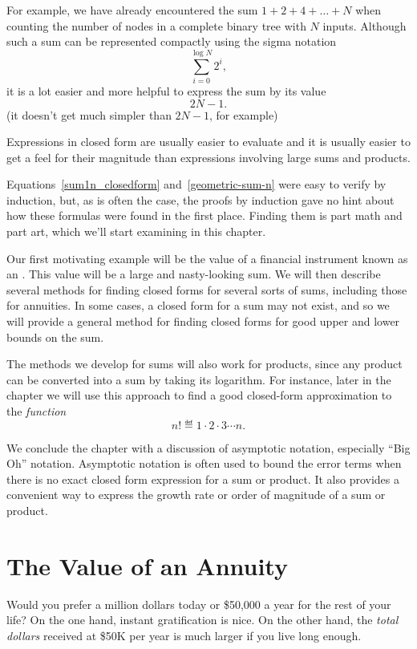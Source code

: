 For example, we have already encountered the sum $1 + 2 + 4 + \dots +
N$ when counting the number of nodes in a complete binary tree with
$N$ inputs.  Although such a sum can be represented compactly using
the sigma notation
\begin{equation}
    \sum_{i = 0}^{\log N} 2^i,
\end{equation}
it is a lot easier and more helpful to express the sum by
its  value
\[
    2 N - 1.
\]
(it doesn't get much simpler than $2 N - 1$, for example) 

Expressions in closed form are usually easier to evaluate and it is
usually easier to get a feel for their magnitude than expressions
involving large sums and products.\fi

Equations~\eqref{sum1n_closedform} and~\eqref{geometric-sum-n} were
easy to verify by induction, but, as is often the case, the proofs by
induction gave no hint about how these formulas were found in the
first place.  Finding them is part math and part art, which we'll
start examining in this chapter.

Our first motivating example will be the value of a financial
instrument known as an .  This value will be a large and
nasty-looking sum.  We will then describe several methods for finding
closed forms for several sorts of sums, including those for annuities.
In some cases, a closed form for a sum may not exist, and so we will
provide a general method for finding closed forms for good upper and
lower bounds on the sum.

The methods we develop for sums will also work for products, since any
product can be converted into a sum by taking its logarithm.  For
instance, later in the chapter we will use this approach to find a
good closed-form approximation to the \emph{ function}
\[
    n! \eqdef 1 \cdot 2 \cdot 3 \cdots n.
\]

We conclude the chapter with a discussion of asymptotic notation,
especially ``Big Oh'' notation.  Asymptotic notation is often used to
bound the error terms when there is no exact closed form expression
for a sum or product.  It also provides a convenient way to express
the growth rate or order of magnitude of a sum or product.

\section{The Value of an Annuity}\label{annuity_sec}

Would you prefer a million dollars today or \$50,000 a year for the
rest of your life?  On the one hand, instant gratification is nice.
On the other hand, the \emph{total dollars} received at \$50K per year
is much larger if you live long enough.

